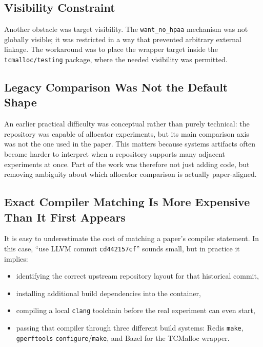 \documentclass[a4paper,11pt]{article}
\begin{document}
\subsection{Visibility Constraint}

Another obstacle was target visibility.
The \texttt{want\_no\_hpaa} mechanism was not globally visible; it was restricted in a way that prevented arbitrary external linkage.
The workaround was to place the wrapper target inside the \texttt{tcmalloc/testing} package, where the needed visibility was permitted.

\subsection{Legacy Comparison Was Not the Default Shape}

An earlier practical difficulty was conceptual rather than purely technical:
the repository was capable of allocator experiments, but its main comparison
axis was not the one used in the paper. This matters because systems artifacts
often become harder to interpret when a repository supports many adjacent
experiments at once. Part of the work was therefore not just adding code, but
removing ambiguity about which allocator comparison is actually paper-aligned.

\subsection{Exact Compiler Matching Is More Expensive Than It First Appears}

It is easy to underestimate the cost of matching a paper's compiler statement.
In this case, ``use LLVM commit \texttt{cd442157cf}'' sounds small, but in
practice it implies:

\begin{itemize}[leftmargin=1.5em]
  \item identifying the correct upstream repository layout for that historical
  commit,
  \item installing additional build dependencies into the container,
  \item compiling a local \texttt{clang} toolchain before the real experiment
  can even start,
  \item passing that compiler through three different build systems:
  Redis \texttt{make}, \texttt{gperftools} \texttt{configure}/\texttt{make},
  and Bazel for the TCMalloc wrapper.
\end{itemize}
\end{document}
